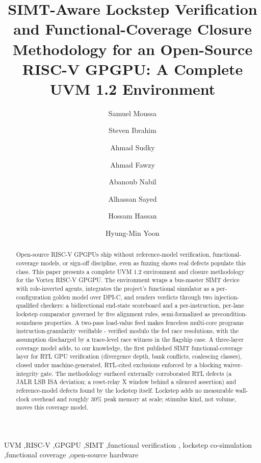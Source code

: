 \documentclass[review,12pt]{elsarticle}
\begin{document}
\begin{frontmatter}

	\title{SIMT-Aware Lockstep Verification and Functional-Coverage Closure
		Methodology for an Open-Source RISC-V GPGPU: A Complete UVM 1.2
		Environment}

	\author[emia,cor1]{Samuel Moussa}
	\author[emia]{Steven Ibrahim}
	\author[emia]{Ahmad Sudky}
	\author[emia]{Ahmad Fawzy}
	\author[emia]{Abanoub Nabil}
	\author[emia]{Alhassan Sayed}
	\author[ind]{Hossam Hassan}
	\author[sil]{Hyung-Min Yoon}


	\begin{abstract}
	Open-source RISC-V GPGPUs ship without reference-model verification, functional-coverage models, or sign-off discipline, even as fuzzing shows real defects populate this class. This paper presents a complete UVM 1.2 environment and closure methodology for the Vortex RISC-V GPGPU. The environment wraps a bus-master SIMT device with role-inverted agents, integrates the project's functional simulator as a per-configuration golden model over DPI-C, and renders verdicts through two injection-qualified checkers: a bidirectional end-state scoreboard and a per-instruction, per-lane lockstep comparator governed by five alignment rules, semi-formalized as precondition-soundness properties. A two-pass load-value feed makes fenceless multi-core programs instruction-granularity verifiable - verified modulo the fed race resolutions, with the assumption discharged by a trace-level race witness in the flagship case. A three-layer coverage model adds, to our knowledge, the first published SIMT functional-coverage layer for RTL GPU verification (divergence depth, bank conflicts, coalescing classes), closed under machine-generated, RTL-cited exclusions enforced by a blocking waiver-integrity gate. The methodology surfaced externally corroborated RTL defects (a JALR LSB ISA deviation; a reset-relay X window behind a silenced assertion) and reference-model defects found by the lockstep itself. Lockstep adds no measurable wall-clock overhead and roughly 30\% peak memory at scale; stimulus kind, not volume, moves this coverage model.
\end{abstract}

	\begin{keyword}
		UVM \sep RISC-V \sep GPGPU \sep SIMT \sep functional verification \sep
		lockstep co-simulation \sep functional coverage \sep open-source hardware
	\end{keyword}

\end{frontmatter}
\end{document}
